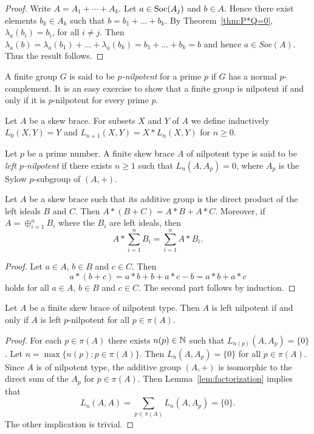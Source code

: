 \begin{proof}
Write $A=A_1+\cdots+A_k$. Let $a\in \operatorname{Soc}(A_j)$ and $b\in A$. Hence
there exist elements $b_k\in A_k$ such that $b=b_1+\dots +b_k$. By
Theorem~\ref{thm:P*Q=0}, $\lambda_a(b_i)=b_i$, for all $i\neq j$.
Then $\lambda_a(b)=\lambda_a(b_1)+\dots +\lambda_a(b_k)=b_1+\dots
+b_k=b$ and hence $a\in Soc(A)$. Thus the result follows.
\end{proof}


A finite group $G$ is said to be {\em $p$-nilpotent} for a prime $p$ if $G$ has a normal $p$-complement. It is an easy exercise to show that a finite group is nilpotent if and only if it is $p$-nilpotent for every prime $p$. 

Let $A$ be a skew brace. For subsets $X$ and $Y$ of $A$ 
we define inductively $L_0(X,Y)=Y$ and $L_{n+1}(X,Y)=X*L_n(X,Y)$ for $n\geq0$.

\begin{definition}
    Let $p$ be a prime number. A finite skew brace $A$ of nilpotent type is said to be \emph{left $p$-nilpotent} if there exists $n\geq1$ such that $L_n(A,A_p)=0$, where $A_p$ is the Sylow $p$-subgroup of $(A,+)$.
\end{definition}

\begin{lemma}
\label{lem:factorization}
    Let $A$ be a skew brace such that its additive group is the direct product of the left 
    ideals $B$ and $C$. Then $A*(B+C)=A*B+A*C$. Moreover, if $A=\oplus_{i=1}^{n} B_i$ where the $B_i$ are left ideals, then 
    \[
    A*\sum_{i=1}^{n} B_i=\sum_{i=1}^{n} A*B_i.
    \]
\end{lemma}

\begin{proof}
    Let $a\in A$, $b\in B$ and $c\in C$. 
    Then 
    \[
    a*(b+c)=a*b+b+a*c-b=a*b+a*c
    \]
    holds for all $a\in A$, $b\in B$ and $c\in C$.
    The second part follows by induction.
\end{proof}

\begin{proposition}
    \label{pro:left_p}
    Let $A$ be a finite skew  brace of nilpotent type. Then $A$ 
    is left nilpotent if and only if $A$ is left $p$-nilpotent for all $p\in\pi(A)$.
\end{proposition}

\begin{proof}
    For each $p\in\pi(A)$ 
    there exists $n(p)\in\mathbb{N}$ such that $L_{n(p)}(A,A_p)=\{0\}$. Let
    $n=\max\{n(p):p\in\pi(A)\}$. Then $L_n(A,A_p)=\{0\}$ for all $p\in\pi(A)$. Since
    $A$ is of nilpotent type, the additive group $(A,+)$ is isomorphic to the direct sum 
    of the $A_p$ for $p\in\pi(A)$. 
    Then Lemma~\ref{lem:factorization} implies that 
    \[
    L_n(A,A)=\sum_{p\in\pi(A)}L_n(A,A_p)=\{0\}.
    \]
    The other implication is trivial. 
\end{proof}

